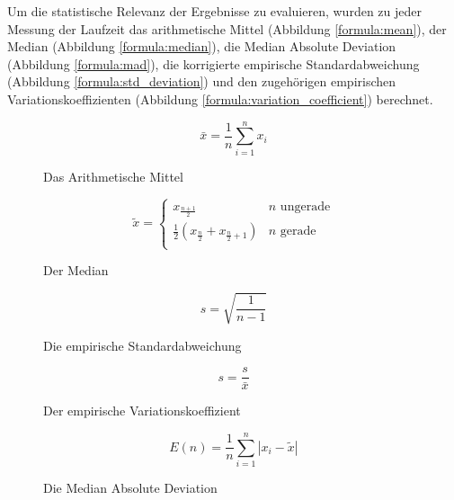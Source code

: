 Um die statistische Relevanz der Ergebnisse zu evaluieren, wurden zu jeder Messung der Laufzeit
das arithmetische Mittel (Abbildung \ref{formula:mean}),
der Median (Abbildung \ref{formula:median}),
die Median Absolute Deviation (Abbildung \ref{formula:mad}),
die korrigierte empirische Standardabweichung (Abbildung \ref{formula:std_deviation}) und
den zugehörigen empirischen Variationskoeffizienten (Abbildung \ref{formula:variation_coefficient}) berechnet.

\begin{figure}
	\caption{Das Arithmetische Mittel}
	\begin{equation}
		\label{formula:mean}
		\bar{x} = \frac{1}{n} \sum_{i=1}^n{x_i}
	\end{equation}
\end{figure}

\begin{figure}
	\caption{Der Median}
	\begin{equation}
		\label{formula:median}
		\tilde{x} =
		\begin{cases}
			x_{\frac{n + 1}{2}} & n \text{ ungerade} \\
			\frac{1}{2}(x_\frac{n}{2} + x_{\frac{n}{2} + 1}) & n \text{ gerade} \\
		\end{cases}
	\end{equation}
\end{figure}

\begin{figure}
	\caption{Die empirische Standardabweichung}
	\begin{equation}
		\label{formula:std_deviation}
		s = \sqrt{\frac{1}{n - 1}}
	\end{equation}
\end{figure}

\begin{figure}
	\caption{Der empirische Variationskoeffizient}
	\begin{equation}
		\label{formula:variation_coefficient}
		s = \frac{s}{\bar{x}}
	\end{equation}
\end{figure}

\begin{figure}
	\caption{Die Median Absolute Deviation}
	\begin{equation}
		\label{formula:mad}
		E(n) = \frac{1}{n} \sum_{i=1}^n{|x_i - \tilde{x}|}
	\end{equation}
\end{figure}




